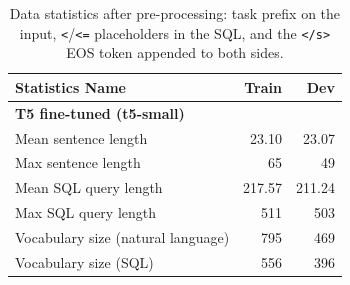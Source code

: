 \documentclass[11pt]{article}
\begin{document}
\begin{table}[H]
\centering
\begin{tabular}{lrr}
\toprule
Statistics Name & Train & Dev \\
\midrule
\multicolumn{3}{l}{\textbf{T5 fine-tuned (t5-small)}} \\
Mean sentence length & 23.10 & 23.07 \\
Max sentence length & 65 & 49 \\
Mean SQL query length & 217.57 & 211.24 \\
Max SQL query length & 511 & 503 \\
Vocabulary size (natural language) & 795 & 469 \\
Vocabulary size (SQL) & 556 & 396 \\
\bottomrule
\end{tabular}
\caption{Data statistics after pre-processing: task prefix on the input, \texttt{<}/\texttt{<=} placeholders in the
SQL, and the \texttt{</s>} EOS token appended to both sides.}
\end{table}
\end{document}
